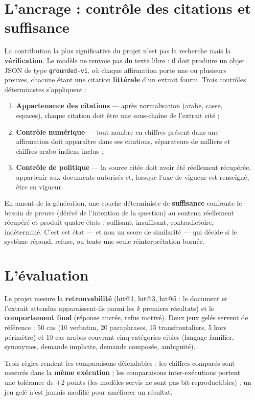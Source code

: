 \documentclass[a4paper,12pt]{report}
\begin{document}
\section{L'ancrage : contrôle des citations et suffisance}
La contribution la plus significative du projet n'est pas la recherche mais la
\textbf{vérification}. Le modèle ne renvoie pas du texte libre : il doit produire un objet JSON de
type \texttt{grounded-v1}, où chaque affirmation porte une ou plusieurs preuves, chacune étant une
citation \textbf{littérale} d'un extrait fourni. Trois contrôles déterministes s'appliquent :
\begin{enumerate}
  \item \textbf{Appartenance des citations} — après normalisation (arabe, casse, espaces), chaque
        citation doit être une sous-chaîne de l'extrait cité ;
  \item \textbf{Contrôle numérique} — tout nombre en chiffres présent dans une affirmation doit
        apparaître dans ses citations, séparateurs de milliers et chiffres arabo-indiens inclus ;
  \item \textbf{Contrôle de politique} — la source citée doit avoir été réellement récupérée,
        appartenir aux documents autorisés et, lorsque l'axe de vigueur est renseigné, être en
        vigueur.
\end{enumerate}
En amont de la génération, une couche déterministe de \textbf{suffisance} confronte le besoin de
preuve (dérivé de l'intention de la question) au contenu réellement récupéré et produit quatre
états : suffisant, insuffisant, contradictoire, indéterminé. C'est cet état — et non un score de
similarité — qui décide si le système répond, refuse, ou tente une seule réinterprétation bornée.

\section{L'évaluation}
Le projet mesure la \textbf{retrouvabilité} (hit@1, hit@3, hit@5 : le document et l'extrait
attendus apparaissent-ils parmi les $k$ premiers résultats) et le \textbf{comportement final}
(réponse ancrée, refus motivé). Deux jeux gelés servent de référence : 50 cas (10 verbatim,
20 paraphrases, 15 transfrontaliers, 5 hors périmètre) et 10 cas arabes couvrant cinq catégories
cibles (langage familier, synonymes, demande implicite, demande composée, ambiguïté).

Trois règles rendent les comparaisons défendables : les chiffres comparés sont mesurés dans la
\textbf{même exécution} ; les comparaisons inter-exécutions portent une tolérance de $\pm 2$ points
(les modèles servis ne sont pas bit-reproductibles) ; un jeu gelé n'est jamais modifié pour
améliorer un résultat.
\end{document}
